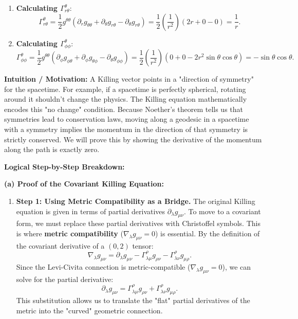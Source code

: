 \begin{solution}
\begin{example}
\begin{enumerate}
    \item \textbf{Calculating $\Gamma^\theta_{r\theta}$}:
    \[ \Gamma^\theta_{r\theta} = \frac{1}{2} g^{\theta\theta} (\partial_r g_{\theta\theta} + \partial_\theta g_{r\theta} - \partial_\theta g_{r\theta}) = \frac{1}{2} \left(\frac{1}{r^2}\right) (2r + 0 - 0) = \frac{1}{r}. \]
    
    \item \textbf{Calculating $\Gamma^\theta_{\phi\phi}$}:
    \[ \Gamma^\theta_{\phi\phi} = \frac{1}{2} g^{\theta\theta} (\partial_\phi g_{\phi\theta} + \partial_\phi g_{\theta\phi} - \partial_\theta g_{\phi\phi}) = \frac{1}{2} \left(\frac{1}{r^2}\right) (0 + 0 - 2r^2 \sin\theta\cos\theta) = -\sin\theta\cos\theta. \]
\end{enumerate}
\end{example}

\textbf{Intuition / Motivation:}
A Killing vector points in a "direction of symmetry" for the spacetime. For example, if a spacetime is perfectly spherical, rotating around it shouldn't change the physics. The Killing equation mathematically encodes this "no change" condition. Because Noether's theorem tells us that symmetries lead to conservation laws, moving along a geodesic in a spacetime with a symmetry implies the momentum in the direction of that symmetry is strictly conserved. We will prove this by showing the derivative of the momentum along the path is exactly zero.

\textbf{Logical Step-by-Step Breakdown:}

\textbf{(a) Proof of the Covariant Killing Equation:}
\begin{enumerate}
    \item \textbf{Step 1: Using Metric Compatibility as a Bridge.}
    The original Killing equation is given in terms of partial derivatives $\partial_\lambda g_{\mu\nu}$. To move to a covariant form, we must replace these partial derivatives with Christoffel symbols. This is where \textbf{metric compatibility} ($\nabla_\lambda g_{\mu\nu} = 0$) is essential. 
    By the definition of the covariant derivative of a $(0,2)$ tensor:
    \[ \nabla_\lambda g_{\mu\nu} = \partial_\lambda g_{\mu\nu} - \Gamma^\rho_{\lambda\mu} g_{\rho\nu} - \Gamma^\rho_{\lambda\nu} g_{\mu\rho}. \]
    Since the Levi-Civita connection is metric-compatible ($\nabla_\lambda g_{\mu\nu} = 0$), we can solve for the partial derivative:
    \[ \partial_\lambda g_{\mu\nu} = \Gamma^\rho_{\lambda\mu} g_{\rho\nu} + \Gamma^\rho_{\lambda\nu} g_{\mu\rho}. \]
    This substitution allows us to translate the "flat" partial derivatives of the metric into the "curved" geometric connection.


\end{enumerate}
\end{solution}
